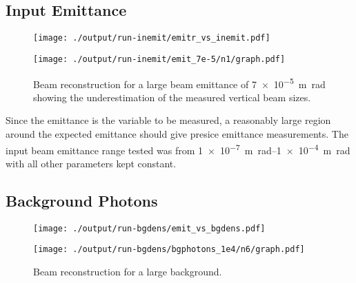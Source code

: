 \subsection{Input Emittance}

\begin{figure}[!tb]
	\centering
		\centering
		\texttt{[image: ./output/run-inemit/emitr\_vs\_inemit.pdf]}
		\caption{
		}
		\label{fig:emitr_inemit}
\end{figure}


\begin{figure}[!tb]
	\centering
	\texttt{[image: ./output/run-inemit/emit\_7e-5/n1/graph.pdf]}
	\caption{
		Beam reconstruction for a large beam emittance of \SI{7e-5}{\meter\radian}
		showing the underestimation of the measured vertical beam sizes.
	}
	\label{fig:large_emit}
\end{figure}

Since the emittance is the variable to be measured, a reasonably large region
around the expected emittance should give presice emittance measurements. The
input beam emittance range tested was from \SIrange{1e-7}{1e-4}{\meter\radian}
with all other parameters kept constant.

\subsection{Background Photons}


\begin{figure}[!t]
	\centering
	\texttt{[image: ./output/run-bgdens/emit\_vs\_bgdens.pdf]}
	\caption{
	}
	\label{fig:emit_bgdens}
\end{figure}


\begin{figure}[!tb]
	\centering
	\texttt{[image: ./output/run-bgdens/bgphotons\_1e4/n6/graph.pdf]}
	\caption{
		Beam reconstruction for a large background.
	}
	\label{fig:large_bg}
\end{figure}



